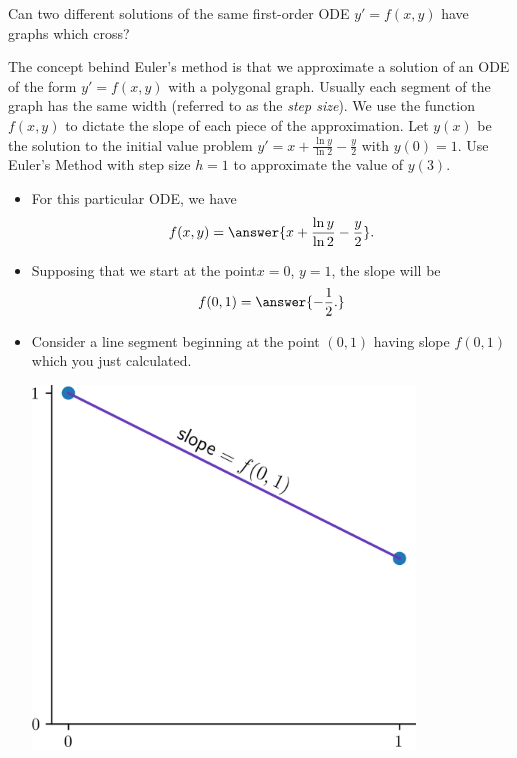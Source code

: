 \documentclass{ximera}
\begin{document}
\begin{example}
Can two different solutions of the same first-order ODE $y' = f(x,y)$ have graphs which cross?
\begin{multipleChoice}
\end{multipleChoice}
\end{example}

\begin{example}
The concept behind Euler's method is that we approximate a solution of an ODE of the form $y' = f(x,y)$ with a polygonal graph. Usually each segment of the graph has the same width (referred to as the \textit{step size}). We use the function $f(x,y)$ to dictate the slope of each piece of the approximation.
Let $y(x)$ be the solution to the initial value problem $y' = x +  \frac{\ln y}{\ln 2} - \frac{y}{2}$ with $y(0) = 1$.  Use Euler's Method with step size $h = 1$ to approximate the value of $y(3)$. 
\begin{itemize}
\item For this particular ODE, we have
\[ f(x,y) = \answer{ x +  \frac{\ln y}{\ln 2} - \frac{y}{2}}. \]
\item Supposing that we start at the point$x = 0$, $y = 1$, the slope will be
\[ f(0,1) = \answer{-\frac{1}{2}.} \]
\item Consider a line segment beginning at the point $(0,1)$ having slope $f(0,1)$ which you just calculated.
\begin{center}
\begin{image}
\includegraphics[width=4in]{images/euler01.png}

\end{image}
\end{center}
\end{itemize}
\end{example}
\end{document}
